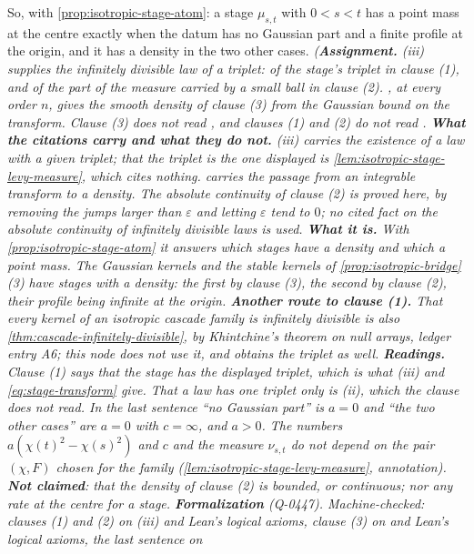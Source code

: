 \begin{proposition}
So, with \ref{prop:isotropic-stage-atom}: a stage $\mu_{s,t}$ with $0 < s < t$ has a point mass
at the centre exactly when the datum has no Gaussian part and a finite profile at the origin,
and it has a density in the two other cases.
\statusA\quad{}\quad{}\quad\emph{(\textbf{Assignment.} (iii)
supplies the infinitely divisible law of a triplet: of the stage's triplet in clause (1), and of
the part of the \Levy{} measure carried by a small ball in clause (2). , at every
order $n$, gives the smooth density of clause (3) from the Gaussian bound on the transform.
Clause (3) does not read , and clauses (1) and (2) do not read .
\textbf{What the citations carry and what they do not.} (iii) carries the existence
of a law with a given triplet; that the triplet is the one displayed is
\ref{lem:isotropic-stage-levy-measure}, which cites nothing.  carries the passage
from an integrable transform to a density. The absolute continuity of clause (2) is proved
here, by removing the jumps larger than $\varepsilon$ and letting $\varepsilon$ tend to $0$; no
cited fact on the absolute continuity of infinitely divisible laws is used. \textbf{What it
is.} With \ref{prop:isotropic-stage-atom} it answers which stages have a density and which a
point mass. The Gaussian kernels and the stable kernels of \ref{prop:isotropic-bridge}(3) have
stages with a density: the first by clause (3), the second by clause (2), their profile being
infinite at the origin. \textbf{Another route to clause (1).} That every kernel of an isotropic
cascade family is infinitely divisible is also
\ref{thm:cascade-infinitely-divisible}, by Khintchine's theorem on null arrays, ledger entry A6;
this node does not use it, and obtains the triplet as well. \textbf{Readings.} Clause (1) says that the stage
has the displayed triplet, which is what (iii) and \ref{eq:stage-transform} give.
That a law has one triplet only is (ii), which the clause does not read. In the last
sentence ``no Gaussian part'' is $a = 0$ and ``the two other cases'' are $a = 0$ with
$c = \infty$, and $a > 0$. The numbers $a(\chi(t)^2 - \chi(s)^2)$ and $c$ and the measure
$\nu_{s,t}$ do not depend on the pair $(\chi, F)$ chosen for the family
(\ref{lem:isotropic-stage-levy-measure}, annotation). \textbf{Not claimed}: that the density of
clause (2) is bounded, or continuous; nor any rate at the centre for a stage.
\textbf{Formalization} (Q-0447). Machine-checked: clauses (1) and (2) on (iii) and
Lean's logical axioms, clause (3) on  and Lean's logical axioms, the last sentence on
}
\end{proposition}
